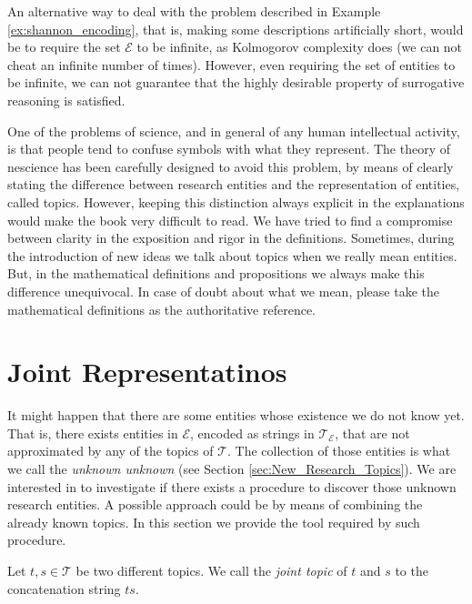 An alternative way to deal with the problem described in Example \ref{ex:shannon_encoding}, that is, making some descriptions artificially short, would be to require the set $\mathcal{E}$ to be infinite, as Kolmogorov complexity does (we can not cheat an infinite number of times). However, even requiring the set of entities to be infinite, we can not guarantee that the highly desirable property of surrogative reasoning is satisfied.

\begin{remark}
One of the problems of science, and in general of any human intellectual activity, is that people tend to confuse symbols with what they represent. The theory of nescience has been carefully designed to avoid this problem, by means of clearly stating the difference between research entities and the representation of entities, called topics. However, keeping this distinction always explicit in the explanations would make the book very difficult to read. We have tried to find a compromise between clarity in the exposition and rigor in the definitions. Sometimes, during the introduction of new ideas we talk about topics when we really mean entities. But, in the mathematical definitions and propositions we always make this difference unequivocal. In case of doubt about what we mean, please take the mathematical definitions as the authoritative reference. 
\end{remark}

%
%

\section{Joint Representatinos}
\label{sec:descriptions_joint_topic}

It might happen that there are some entities whose existence we do not know yet. That is, there exists entities in $\mathcal{E}$, encoded as strings in $\mathcal{T}_\mathcal{E}$, that are not approximated by any of the topics of $\mathcal{T}$. The collection of those entities is what we call the \emph{unknown unknown} (see Section \ref{sec:New_Research_Topics}). We are interested in to investigate if there exists a procedure to discover those unknown research entities. A possible approach could be by means of combining the already known topics. In this section we provide the tool required by such procedure.

\begin{definition}
Let $t, s \in \mathcal{T}$ be two different topics. We call the \emph{joint topic} of $t$ and $s$ to the concatenation string $ts$.
\end{definition}

